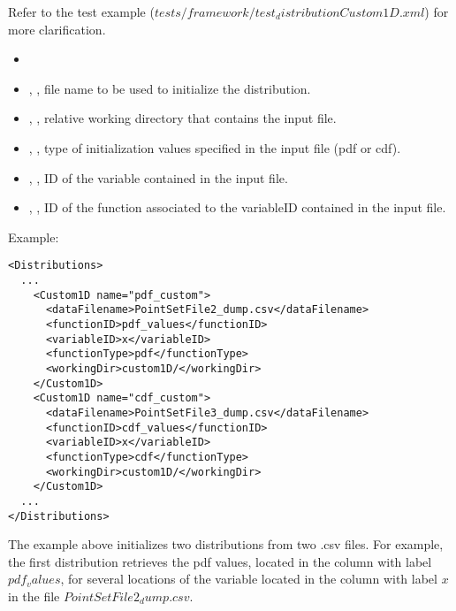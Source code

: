 Refer to the test example ($tests/framework/test_distributionCustom1D.xml$) for more clarification.

%
\attrIntro
\vspace{-5mm}
\begin{itemize}
  \itemsep0em
  \item \nameDescription
\end{itemize}
\vspace{-5mm}
\subnodesIntro
\begin{itemize}
  \item {}, , file name to be used to initialize the distribution.
  \item {}, , relative working directory that contains the input file.
  \item {}, , type of initialization values specified in the input file (pdf or cdf).
  \item {}, , ID of the variable contained in the input file.
  \item {}, , ID of the function associated to the variableID contained in the input file.
\end{itemize}

Example:
\begin{lstlisting}[style=XML]
<Distributions>
  ...
    <Custom1D name="pdf_custom">
      <dataFilename>PointSetFile2_dump.csv</dataFilename>
      <functionID>pdf_values</functionID>
      <variableID>x</variableID>
      <functionType>pdf</functionType>
      <workingDir>custom1D/</workingDir>
    </Custom1D>
    <Custom1D name="cdf_custom">
      <dataFilename>PointSetFile3_dump.csv</dataFilename>
      <functionID>cdf_values</functionID>
      <variableID>x</variableID>
      <functionType>cdf</functionType>
      <workingDir>custom1D/</workingDir>
    </Custom1D>
  ...
</Distributions>
\end{lstlisting}


The example above initializes two distributions from two .csv files. 
For example, the first distribution retrieves the pdf values, located in the column with label $pdf_values$, for several locations of the variable located in the column 
with label $x$ in the file $PointSetFile2_dump.csv$.


